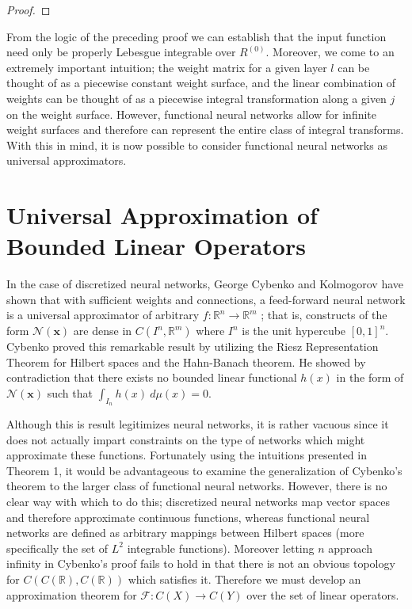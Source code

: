 \documentclass{article}
\begin{document}
\begin{proof}
\end{proof}


From the logic of the preceding proof we can establish that the input function need only be properly Lebesgue integrable over $R^{(0)}$. Moreover, we come to an extremely important intuition; the weight matrix for a given layer $l$ can be thought of as a piecewise constant weight surface, and the linear combination of weights can be thought of as a piecewise integral transformation along a given $j$ on the weight surface. However, functional neural networks allow for infinite weight surfaces and therefore can represent the entire class of integral transforms. With this in mind, it is now possible to consider functional neural networks as universal approximators.


\section{Universal Approximation of Bounded Linear Operators}
In the case of discretized neural networks, George Cybenko and Kolmogorov have shown that with sufficient weights and connections, a feed-forward neural network is a universal approximator of arbitrary $f:\mathbb{R}^n \to \mathbb{R}^m$ \cite{univapprox}; that is, constructs of the form $\mathcal{N}(\pmb{x})$ are dense in $C(I^n, \mathbb{R}^m)$ where $I^n$ is the unit hypercube $[0,1]^n$.  Cybenko proved this remarkable result by utilizing the Riesz Representation Theorem for Hilbert spaces and the Hahn-Banach theorem. He showed by contradiction that there exists no bounded linear functional $h(x)$ in the form of $\mathcal{N}(\pmb{x})$ such that $\int_{I_n}h(x)\ d\mu(x) = 0$.

Although this is result legitimizes neural networks, it is rather vacuous since it does not actually impart constraints on the type of networks which might approximate these functions.
Fortunately using the intuitions presented in Theorem 1, it would be advantageous to examine the generalization of Cybenko's theorem to the larger class of functional neural networks. However, there is no clear way with which to do this; discretized neural networks map vector spaces and therefore approximate continuous functions, whereas functional neural networks are defined as arbitrary mappings between Hilbert spaces (more specifically the set of $L^2$ integrable functions). Moreover letting $n$ approach infinity in Cybenko's proof fails to hold in that there is not an obvious topology for $C(C(\mathbb{R}), C(\mathbb{R}))$ which satisfies it. Therefore we must develop an approximation theorem for $\mathcal{F}: C(X) \to C(Y)$ over the set of linear operators. 
\end{document}
